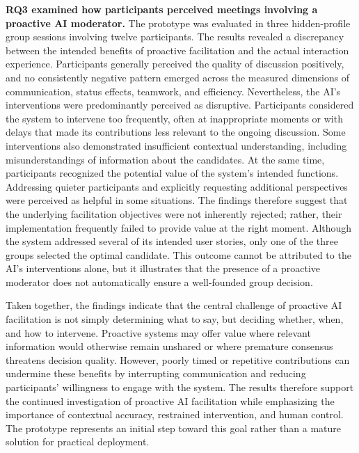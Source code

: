 \textbf{RQ3 examined how participants perceived meetings involving a proactive AI moderator.}
The prototype was evaluated in three hidden-profile group sessions involving twelve participants. The results revealed a
discrepancy between the intended benefits of proactive facilitation and the actual interaction experience.
Participants generally perceived the quality of discussion positively, and no consistently negative pattern
emerged across the measured dimensions of communication, status effects, teamwork, and efficiency.
Nevertheless, the AI's interventions were predominantly perceived as disruptive. Participants considered the
system to intervene too frequently, often at inappropriate moments or with delays that made its contributions
less relevant to the ongoing discussion. Some interventions also demonstrated insufficient contextual
understanding, including misunderstandings of information about the candidates.
At the same time, participants recognized the potential value of the system's intended functions. Addressing
quieter participants and explicitly requesting additional perspectives were perceived as helpful in some
situations. The findings therefore suggest that the underlying facilitation objectives were not inherently
rejected; rather, their implementation frequently failed to provide value at the right moment. Although the
system addressed several of its intended user stories, only one of the three groups selected the optimal
candidate. This outcome cannot be attributed to the AI's interventions alone, but it illustrates that the
presence of a proactive moderator does not automatically ensure a well-founded group decision.

Taken together, the findings indicate that the central challenge of proactive AI facilitation is not simply
determining what to say, but deciding whether, when, and how to intervene. Proactive systems may offer value
where relevant information would otherwise remain unshared or where premature consensus threatens decision
quality. However, poorly timed or repetitive contributions can undermine these benefits by interrupting
communication and reducing participants' willingness to engage with the system. The results therefore support
the continued investigation of proactive AI facilitation while emphasizing the importance of contextual
accuracy, restrained intervention, and human control. The prototype represents an initial step toward this
goal rather than a mature solution for practical deployment.

